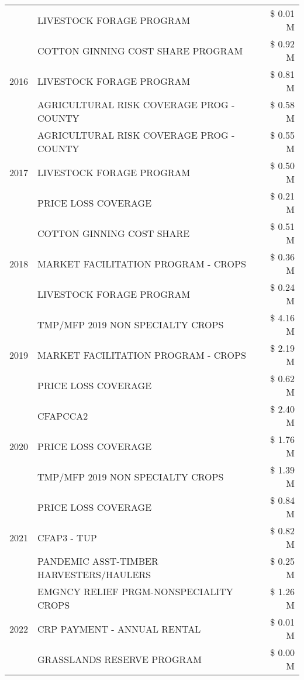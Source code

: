 \begin{tabular}{llr}
 & LIVESTOCK FORAGE PROGRAM & \$ 0.01 M \\
\cline{1-3}
\multirow[t]{3}{*}{2016} & COTTON GINNING COST SHARE PROGRAM & \$ 0.92 M \\
 & LIVESTOCK FORAGE PROGRAM & \$ 0.81 M \\
 & AGRICULTURAL RISK COVERAGE PROG - COUNTY & \$ 0.58 M \\
\cline{1-3}
\multirow[t]{3}{*}{2017} & AGRICULTURAL RISK COVERAGE PROG - COUNTY & \$ 0.55 M \\
 & LIVESTOCK FORAGE PROGRAM & \$ 0.50 M \\
 & PRICE LOSS COVERAGE & \$ 0.21 M \\
\cline{1-3}
\multirow[t]{3}{*}{2018} & COTTON GINNING COST SHARE & \$ 0.51 M \\
 & MARKET FACILITATION PROGRAM - CROPS & \$ 0.36 M \\
 & LIVESTOCK FORAGE PROGRAM & \$ 0.24 M \\
\cline{1-3}
\multirow[t]{3}{*}{2019} & TMP/MFP 2019 NON SPECIALTY CROPS & \$ 4.16 M \\
 & MARKET FACILITATION PROGRAM - CROPS & \$ 2.19 M \\
 & PRICE LOSS COVERAGE & \$ 0.62 M \\
\cline{1-3}
\multirow[t]{3}{*}{2020} & CFAPCCA2 & \$ 2.40 M \\
 & PRICE LOSS COVERAGE & \$ 1.76 M \\
 & TMP/MFP 2019 NON SPECIALTY CROPS & \$ 1.39 M \\
\cline{1-3}
\multirow[t]{3}{*}{2021} & PRICE LOSS COVERAGE & \$ 0.84 M \\
 & CFAP3 - TUP & \$ 0.82 M \\
 & PANDEMIC ASST-TIMBER HARVESTERS/HAULERS & \$ 0.25 M \\
\cline{1-3}
\multirow[t]{3}{*}{2022} & EMGNCY RELIEF PRGM-NONSPECIALITY CROPS & \$ 1.26 M \\
 & CRP PAYMENT - ANNUAL RENTAL & \$ 0.01 M \\
 & GRASSLANDS RESERVE PROGRAM & \$ 0.00 M \\
\cline{1-3}
\bottomrule
\end{tabular}

